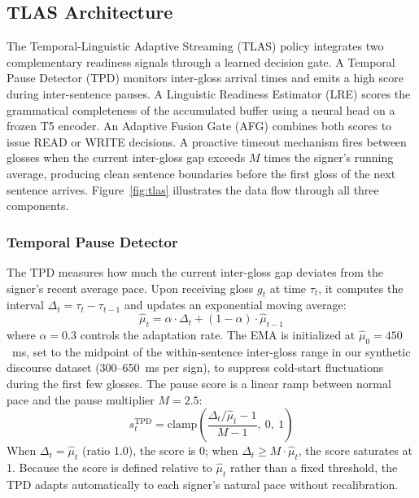 \documentclass[conference]{IEEEtran}
\begin{document}
\subsection{TLAS Architecture}

The Temporal-Linguistic Adaptive Streaming (TLAS) policy integrates two complementary readiness signals through a learned decision gate. A Temporal Pause Detector (TPD) monitors inter-gloss arrival times and emits a high score during inter-sentence pauses. A Linguistic Readiness Estimator (LRE) scores the grammatical completeness of the accumulated buffer using a neural head on a frozen T5 encoder. An Adaptive Fusion Gate (AFG) combines both scores to issue READ or WRITE decisions. A proactive timeout mechanism fires between glosses when the current inter-gloss gap exceeds $M$ times the signer's running average, producing clean sentence boundaries before the first gloss of the next sentence arrives. Figure~\ref{fig:tlas} illustrates the data flow through all three components.

\subsubsection{Temporal Pause Detector}

The TPD measures how much the current inter-gloss gap deviates from the signer's recent average pace. Upon receiving gloss $g_t$ at time $\tau_t$, it computes the interval $\Delta_t = \tau_t - \tau_{t-1}$ and updates an exponential moving average:
\begin{equation}
    \hat{\mu}_t = \alpha \cdot \Delta_t + (1 - \alpha) \cdot \hat{\mu}_{t-1}
    \label{eq:ema}
\end{equation}
where $\alpha = 0.3$ controls the adaptation rate. The EMA is initialized at $\hat{\mu}_0 = 450$~ms, set to the midpoint of the within-sentence inter-gloss range in our synthetic discourse dataset (300--650~ms per sign), to suppress cold-start fluctuations during the first few glosses. The pause score is a linear ramp between normal pace and the pause multiplier $M = 2.5$:
\begin{equation}
    s_t^{\text{TPD}} = \text{clamp}\!\left(\frac{\Delta_t / \hat{\mu}_t - 1}{M - 1},\ 0,\ 1\right)
    \label{eq:pause_score}
\end{equation}
When $\Delta_t = \hat{\mu}_t$ (ratio 1.0), the score is 0; when $\Delta_t \geq M \cdot \hat{\mu}_t$, the score saturates at 1. Because the score is defined relative to $\hat{\mu}_t$ rather than a fixed threshold, the TPD adapts automatically to each signer's natural pace without recalibration.
\end{document}
